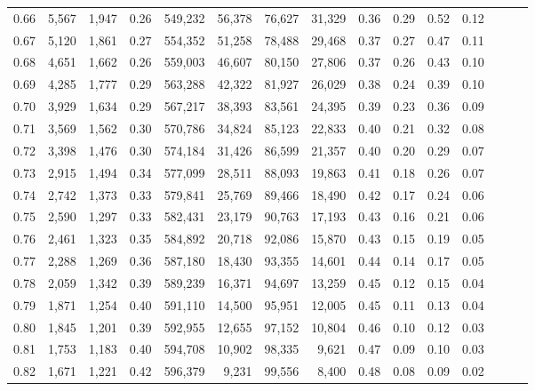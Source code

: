 \begin{tabular}{rrrrrrrrrrrrrrr}
0.66 &   5,567 &  1,947 &  0.26 &  549,232 &   56,378 &   76,627 &   31,329 &  0.36 &  0.29 &  0.52 &      0.12 \\
0.67 &   5,120 &  1,861 &  0.27 &  554,352 &   51,258 &   78,488 &   29,468 &  0.37 &  0.27 &  0.47 &      0.11 \\
0.68 &   4,651 &  1,662 &  0.26 &  559,003 &   46,607 &   80,150 &   27,806 &  0.37 &  0.26 &  0.43 &      0.10 \\
0.69 &   4,285 &  1,777 &  0.29 &  563,288 &   42,322 &   81,927 &   26,029 &  0.38 &  0.24 &  0.39 &      0.10 \\
0.70 &   3,929 &  1,634 &  0.29 &  567,217 &   38,393 &   83,561 &   24,395 &  0.39 &  0.23 &  0.36 &      0.09 \\
0.71 &   3,569 &  1,562 &  0.30 &  570,786 &   34,824 &   85,123 &   22,833 &  0.40 &  0.21 &  0.32 &      0.08 \\
0.72 &   3,398 &  1,476 &  0.30 &  574,184 &   31,426 &   86,599 &   21,357 &  0.40 &  0.20 &  0.29 &      0.07 \\
0.73 &   2,915 &  1,494 &  0.34 &  577,099 &   28,511 &   88,093 &   19,863 &  0.41 &  0.18 &  0.26 &      0.07 \\
0.74 &   2,742 &  1,373 &  0.33 &  579,841 &   25,769 &   89,466 &   18,490 &  0.42 &  0.17 &  0.24 &      0.06 \\
0.75 &   2,590 &  1,297 &  0.33 &  582,431 &   23,179 &   90,763 &   17,193 &  0.43 &  0.16 &  0.21 &      0.06 \\
0.76 &   2,461 &  1,323 &  0.35 &  584,892 &   20,718 &   92,086 &   15,870 &  0.43 &  0.15 &  0.19 &      0.05 \\
0.77 &   2,288 &  1,269 &  0.36 &  587,180 &   18,430 &   93,355 &   14,601 &  0.44 &  0.14 &  0.17 &      0.05 \\
0.78 &   2,059 &  1,342 &  0.39 &  589,239 &   16,371 &   94,697 &   13,259 &  0.45 &  0.12 &  0.15 &      0.04 \\
0.79 &   1,871 &  1,254 &  0.40 &  591,110 &   14,500 &   95,951 &   12,005 &  0.45 &  0.11 &  0.13 &      0.04 \\
0.80 &   1,845 &  1,201 &  0.39 &  592,955 &   12,655 &   97,152 &   10,804 &  0.46 &  0.10 &  0.12 &      0.03 \\
0.81 &   1,753 &  1,183 &  0.40 &  594,708 &   10,902 &   98,335 &    9,621 &  0.47 &  0.09 &  0.10 &      0.03 \\
0.82 &   1,671 &  1,221 &  0.42 &  596,379 &    9,231 &   99,556 &    8,400 &  0.48 &  0.08 &  0.09 &      0.02 \\

\end{tabular}
